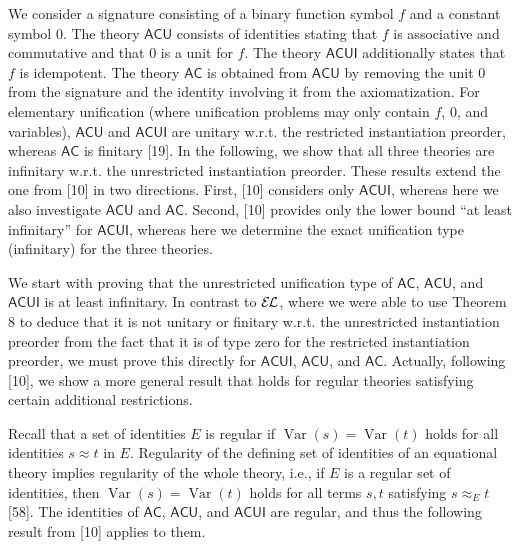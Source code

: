 \documentclass[10pt,a4paper]{amsart}
\begin{document}
We consider a signature consisting of a binary function symbol $f$ and a constant symbol $0$. The theory $\mathsf{ACU}$ consists of identities stating that $f$ is associative and commutative and that $0$ is a unit for $f$. The theory $\mathsf{ACUI}$ additionally states that $f$ is idempotent. The theory $\mathsf{AC}$ is obtained from $\mathsf{ACU}$ by removing the unit $0$ from the signature and the identity involving it from the axiomatization. For elementary unification (where unification problems may only contain $f$, $0$, and variables), $\mathsf{ACU}$ and $\mathsf{ACUI}$ are unitary w.r.t. the restricted instantiation preorder, whereas $\mathsf{AC}$ is finitary [19]. In the following, we show that all three theories are infinitary w.r.t. the unrestricted instantiation preorder. These results extend the one from [10] in two directions. First, [10] considers only $\mathsf{ACUI}$, whereas here we also investigate $\mathsf{ACU}$ and $\mathsf{AC}$. Second, [10] provides only the lower bound “at least infinitary” for $\mathsf{ACUI}$, whereas here we determine the exact unification type (infinitary) for the three theories.\par
 
 
 
We start with proving that the unrestricted unification type of $\mathsf{AC}$, $\mathsf{ACU}$, and $\mathsf{ACUI}$ is at least infinitary. In contrast to $\mathcal{E\mkern-1.618muL}$, where we were able to use Theorem 8 to deduce that it is not unitary or finitary w.r.t. the unrestricted instantiation preorder from the fact that it is of type zero for the restricted instantiation preorder, we must prove this directly for $\mathsf{ACUI}$, $\mathsf{ACU}$, and $\mathsf{AC}$. Actually, following [10], we show a more general result that holds for regular theories satisfying certain additional restrictions.\par
 
 
 
Recall that a set of identities $E$ is regular if $\operatorname{Var}(s)=\operatorname{Var}(t)$ holds for all identities $s\approx t$ in $E$. Regularity of the defining set of identities of an equational theory implies regularity of the whole theory, i.e., if $E$ is a regular set of identities, then $\operatorname{Var}(s)=\operatorname{Var}(t)$ holds for all terms $s,t$ satisfying $s\approx_{E}t$ [58]. The identities of $\mathsf{AC}$, $\mathsf{ACU}$, and $\mathsf{ACUI}$ are regular, and thus the following result from [10] applies to them.\par
 
\end{document}
